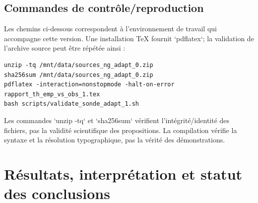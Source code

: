 \documentclass[11pt,a4paper,oneside]{report}
\begin{document}
\section{Commandes de contrôle/reproduction}
Les chemins ci-dessous correspondent à l'environnement de travail qui accompagne cette version. Une installation TeX fournit `pdflatex`; la validation de l'archive source peut être répétée ainsi :
\begin{verbatim}
unzip -tq /mnt/data/sources_ng_adapt_0.zip
sha256sum /mnt/data/sources_ng_adapt_0.zip
pdflatex -interaction=nonstopmode -halt-on-error rapport_th_emp_vs_obs_1.tex
bash scripts/validate_sonde_adapt_1.sh
\end{verbatim}
Les commandes `unzip -tq` et `sha256sum` vérifient l'intégrité/identité des fichiers, pas la validité scientifique des propositions. La compilation vérifie la syntaxe et la résolution typographique, pas la vérité des démonstrations.

\chapter{Résultats, interprétation et statut des conclusions}
\end{document}
